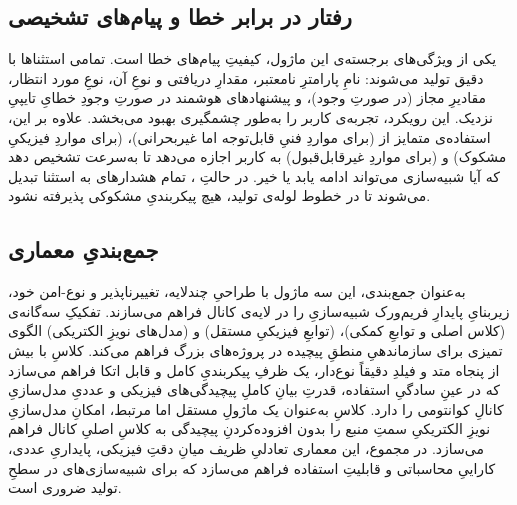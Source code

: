 \subsection{رفتار در برابر خطا و پیام‌های تشخیصی}

یکی از ویژگی‌های برجسته‌ی این ماژول، کیفیتِ پیام‌های خطا است. تمامی استثناها با  دقیق تولید می‌شوند: نامِ پارامترِ نامعتبر، مقدارِ دریافتی و نوعِ آن، نوعِ مورد انتظار، مقادیرِ مجاز (در صورتِ وجود)، و پیشنهادهای هوشمند در صورتِ وجودِ خطایِ تایپیِ نزدیک. این رویکرد، تجربه‌ی کاربر را به‌طور چشمگیری بهبود می‌بخشد. علاوه بر این، استفاده‌ی متمایز از  (برای مواردِ فنیِ قابل‌توجه اما غیربحرانی)،  (برای مواردِ فیزیکیِ مشکوک) و  (برای مواردِ غیرقابل‌قبول) به کاربر اجازه می‌دهد تا به‌سرعت تشخیص دهد که آیا شبیه‌سازی می‌تواند ادامه یابد یا خیر. در حالتِ ، تمام هشدارهای  به استثنا تبدیل می‌شوند تا در خطوط لوله‌ی تولید، هیچ پیکربندیِ مشکوکی پذیرفته نشود.

\subsection{جمع‌بندیِ معماری}

به‌عنوان جمع‌بندی، این سه ماژول با طراحیِ چندلایه، تغییرناپذیر و نوع-امن خود، زیربنایِ پایدارِ فریم‌ورک شبیه‌سازیِ  را در لایه‌ی کانال فراهم می‌سازند. تفکیکِ سه‌گانه‌ی  (کلاس اصلی و توابعِ کمکی)،  (توابعِ فیزیکیِ مستقل) و  (مدل‌های نویزِ الکتریکی) الگوی تمیزی برای سازماندهیِ منطقِ پیچیده در پروژه‌های بزرگ فراهم می‌کند. کلاسِ  با بیش از پنجاه متد و فیلدِ دقیقاً نوع‌دار، یک ظرفِ پیکربندیِ کامل و قابل اتکا فراهم می‌سازد که در عینِ سادگیِ استفاده، قدرتِ بیانِ کاملِ پیچیدگی‌های فیزیکی و عددیِ مدل‌سازیِ کانالِ کوانتومی را دارد. کلاسِ  به‌عنوان یک ماژولِ مستقل اما مرتبط، امکانِ مدل‌سازیِ نویزِ الکتریکیِ سمتِ منبع را بدون افزوده‌کردنِ پیچیدگی به کلاسِ اصلیِ کانال فراهم می‌سازد. در مجموع، این معماری تعادلیِ ظریف میانِ دقتِ فیزیکی، پایداریِ عددی، کاراییِ محاسباتی و قابلیتِ استفاده فراهم می‌سازد که برای شبیه‌سازی‌های  در سطحِ تولید ضروری است.
